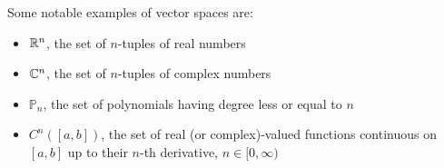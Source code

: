 \begin{example}
    Some notable examples of vector spaces are:
    \begin{itemize}
        \item $\mathbb{R}^n$, the set of $n$-tuples of real numbers
        \item $\mathbb{C}^n$, the set of $n$-tuples of complex numbers
        \item $\mathbb{P}_n$, the set of polynomials having degree less or equal to $n$
        \item $C^n([a, b])$, the set of real (or complex)-valued functions continuous on $[a, b]$ up to their $n$-th derivative, $n \in [0, \infty)$
    \end{itemize}
\end{example}